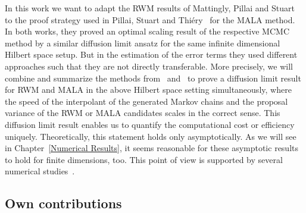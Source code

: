 In this work we want to adapt the RWM results of Mattingly, Pillai and Stuart~\autocite{Mattingly2010} to the proof strategy used in Pillai, Stuart and Thi\'{e}ry~\autocite{Pillai2012} for the MALA method. In both works, they proved an optimal scaling result of the respective MCMC method by a similar diffusion limit ansatz for the same infinite dimensional Hilbert space setup. But in the estimation of the error terms they used different approaches such that they are not directly transferable. More precisely, we will combine and summarize the methods from~\autocite{Mattingly2010} and~\autocite{Pillai2012} to prove a diffusion limit result for RWM and MALA in the above Hilbert space setting simultaneously, where the speed of the interpolant of the generated Markov chains and the proposal variance of the RWM or MALA candidates scales in the correct sense. This diffusion limit result enables us to quantify the computational cost or efficiency uniquely. Theoretically, this statement holds only asymptotically. As we will see in Chapter~\ref{Numerical Results}, it seems reasonable for these asymptotic results to hold for finite dimensions, too. This point of view is supported by several numerical studies~\autocite{Beskos2008, Gelman1996, Roberts2001}.



\subsection*{Own contributions}

